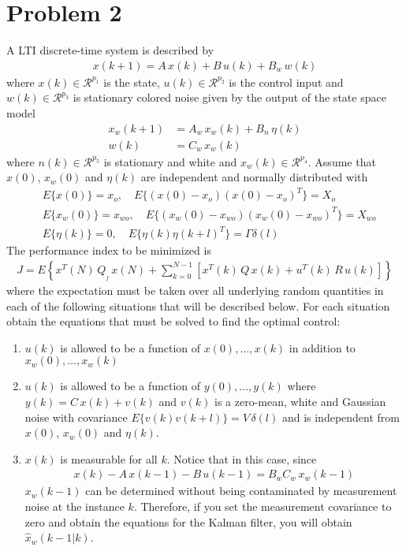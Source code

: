 \section*{Problem 2}

A LTI discrete-time system is described by
\begin{align*}
    x(k+1) = A \, x(k) + B\, u(k) + B_w \, w(k)
\end{align*}
where $x(k) \in \mathcal{R}^{p_1}$ is the state, $u(k) \in \mathcal{R}^{p_2}$ is the control input and $w(k) \in \mathcal{R}^{p_3}$ is stationary colored noise given by the output of the state space model
\begin{align*}
    x_w(k+1) & = A_w \, x_w(k) + B_n \, \eta(k) \\
    w(k) & = C_w \, x_w(k)
\end{align*}
where $n(k) \in \mathcal{R}^{p_5}$ is stationary and white and $x_w(k) \in \mathcal{R}^{p_4}$. Assume that $x(0)$, $x_w(0)$  and $\eta(k)$ are independent and normally distributed with
\begin{align*}
    &E\{ x(0) \} = x_o, \hspace{1em} E\{ (x(0) - x_o)(x(0) - x_o)^T \} = X_o\\
    &E\{ x_w(0) \} = x_{wo}, \hspace{1em} E\{ (x_{w}(0) - x_{wo})(x_{w}(0) - x_{wo})^T \} = X_{wo}\\
    &E\{ \eta(k) \} = 0, \hspace{1em} E\{ \eta(k)\eta(k+l)^T \} = \Gamma \delta(l)
\end{align*}
The performance index to be minimized is
\begin{align*}
    J = E \left \{ x^T(N)\,  Q_{_f} \, x(N) + \sum_{k=0}^{N-1}
        \left [x^T(k)\,  Q \, x(k) + u^T(k)\,  R \, u(k) \right ] \right \}
\end{align*}
where the expectation must be taken over all underlying  random quantities in each of the following situations that will be described below. For each situation obtain the equations that must be solved to find the optimal control:

\begin{enumerate}
\item
$u(k)$ is allowed to be a function of $x(0),\ldots,x(k)$ in addition to $x_w(0),\ldots,x_w(k)$

\item
$u(k)$ is allowed to be a function of $y(0),\ldots,y(k)$ where $y(k) = C \, x(k) + v(k)$ and $v(k)$ is a zero-mean, white and Gaussian noise with covariance $E\{ v(k) v(k+l) \} = V\,\delta(l)$ and is independent from $x(0)$, $x_w(0)$ and $\eta(k)$.

\item
$x(k)$ is measurable for all $k$. Notice that in this case, since
\begin{align*}
x(k) - A \, x(k-1) - B \, u(k-1) = B_w C_w\, x_w(k-1)
\end{align*}
$x_w(k-1)$ can be determined without being contaminated by measurement noise at the instance $k$. Therefore, if you set the measurement covariance to zero and obtain the equations for the Kalman filter, you will obtain $\hat x_w(k-1 |k)$.

\end{enumerate}
